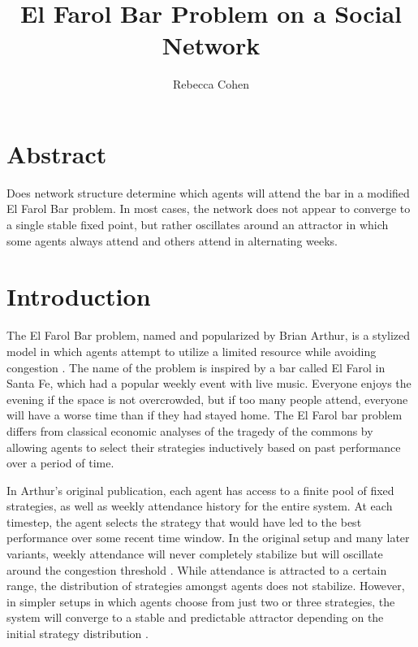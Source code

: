 \documentclass[12pt]{article}
\title{El Farol Bar Problem on a Social Network}
\author{Rebecca Cohen}
\begin{document}
\maketitle
\section{Abstract}
Does network structure determine which agents will attend the bar in a modified El Farol Bar problem.  In most cases, the network does not appear to converge to a single stable fixed point, but rather oscillates around an attractor in which some agents always attend and others attend in alternating weeks.  

\section{Introduction}

The El Farol Bar problem, named and popularized by Brian Arthur, is a stylized model in which agents attempt to utilize a limited resource while avoiding congestion \cite{arthur:1994}.  The name of the problem is inspired by a bar called El Farol in Santa Fe, which had a popular weekly event with live music.  Everyone enjoys the evening if the space is not overcrowded, but if too many people attend, everyone will have a worse time than if they had stayed home.  The El Farol bar problem differs from classical economic analyses of the tragedy of the commons by allowing agents to select their strategies inductively based on past performance over a period of time.

In Arthur's original publication, each agent has access to a finite pool of fixed strategies, as well as weekly attendance history for the entire system.  At each timestep, the agent selects the strategy that would have led to the best performance over some recent time window.  In the original setup and many later variants, weekly attendance will never completely stabilize but will oscillate around the congestion threshold \cite{arthur:1994} \cite{chen:2012} \cite{zambrano:2004}.  While attendance is attracted to a certain range, the distribution of strategies amongst agents does not stabilize.  However, in simpler setups in which agents choose from just two or three strategies, the system will converge to a stable and predictable attractor depending on the initial strategy distribution \cite{stLuce:2020}.
\end{document}

